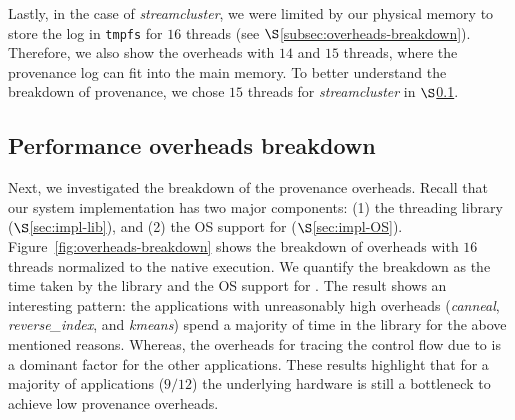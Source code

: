 Lastly, in the case of {\em streamcluster}, we were limited by our physical memory to store the log in {\tt tmpfs} for $16$ threads (see $\S$\ref{subsec:overheads-breakdown}). Therefore, we also show the overheads with $14$ and $15$ threads,  where the provenance log can fit into the main memory.  To better understand the breakdown of provenance, we chose $15$ threads for {\em streamcluster} in $\S$\ref{subsec:performance-overheads-breakdown}.



%


%



\subsection{Performance overheads breakdown} 
\label{subsec:performance-overheads-breakdown}

Next, we investigated the breakdown of the provenance overheads. Recall that our system implementation has two major components: (1) the threading library ($\S$\ref{sec:impl-lib}), and (2) the OS support for \intelpt ($\S$\ref{sec:impl-OS}). 
Figure~\ref{fig:overheads-breakdown} shows the breakdown of overheads with $16$ threads normalized to the native \pthreads execution. We quantify the breakdown as the time taken by the \projecttitle library  and the OS support for \intelpt  . The result shows an interesting pattern: the applications with unreasonably high overheads ({\em canneal}, {\em reverse\_index}, and {\em kmeans}) spend a majority of time in the \projecttitle library for the above mentioned reasons. Whereas, the overheads for tracing the control flow due to \intelpt  is a dominant factor for the other applications. These results highlight that for a majority of applications ($9/12$) the underlying hardware is still a bottleneck to achieve low provenance overheads.  


